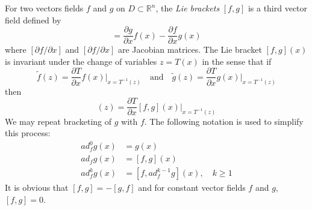 \documentclass[11pt,a4paper,oneside]{book}
\numberwithin{equation}{section}
\theoremstyle{it}
\theoremstyle{definition}
\begin{document}
For two vectors fields $f$ and $g$ on $D\subset\mathbb{R}^n$, the \textit{Lie 
brackets} $[f,g]$ is a third vector field defined by
\begin{equation}
[f,g]=\frac{\partial g}{\partial x}f(x)-\frac{\partial f}{\partial x}g(x)
\end{equation} 
where $[\partial f/\partial x]$ and $[\partial f/\partial x]$ are Jacobian 
matrices. The Lie bracket $[f,g](x)$ is invariant under the change of variables 
$z=T(x)$ in the sense that if
\begin{equation}
	\tilde{f}(z)=\frac{\partial T}{\partial 
	x}f(x)\Bigg|_{x=T^{-1}(z)}\quad\text{and}\quad 
	\tilde{g}(z)=\frac{\partial T}{\partial x}g(x)\Bigg|_{x=T^{-1}(z)}
\end{equation}
then
\begin{equation}
	[\tilde{f},\tilde{g}](z)=\frac{\partial T}{\partial 
		x}[{f},{g}](x)\Bigg|_{x=T^{-1}(z)}
\end{equation}
We may repeat bracketing of $g$ with $f$. The following notation is used to 
simplify this process:
\begin{equation*}
	\begin{aligned}
			ad_f^0g(x)&=g(x) \\[6pt]
			ad_fg(x)&=[f,g](x) \\[6pt]
			ad_f^kg(x)&=[f,ad_f^{k-1}g](x),\quad k\ge1
	\end{aligned}
\end{equation*}
It is obvious that $[f,g]=-[g,f]$ and for constant vector fields $f$ and $g$, 
$[f,g]=0$.
\end{document}
